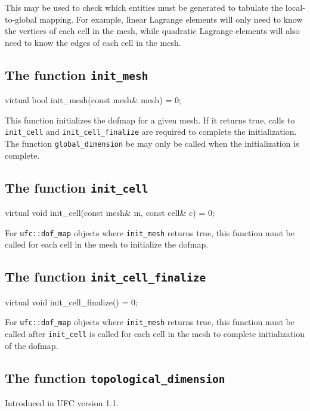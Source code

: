 This may be used to check which entities must be generated to tabulate
the local-to-global mapping. For example, linear Lagrange elements
will only need to know the vertices of each cell in the mesh, while
quadratic Lagrange elements will also need to know the edges of each
cell in the mesh.

\subsection{The function \texttt{init\_mesh}}

\begin{code}
virtual bool init_mesh(const mesh& mesh) = 0;
\end{code}

This function initializes the dofmap for a given mesh. If it returns
true, calls to \texttt{init\_cell} and \texttt{init\_cell\_finalize}
are required to complete the initialization. The function
\texttt{global\_dimension} be may only be called when the
initialization is complete.

\subsection{The function \texttt{init\_cell}}

\begin{code}
virtual void init_cell(const mesh& m,
                       const cell& c) = 0;
\end{code}

For \texttt{ufc::dof\_map} objects where \texttt{init\_mesh} returns true,
this function must be called for each cell in the mesh to initialize
the dofmap.

\subsection{The function \texttt{init\_cell\_finalize}}

\begin{code}
virtual void init_cell_finalize() = 0;
\end{code}

For \texttt{ufc::dof\_map} objects where \texttt{init\_mesh} returns
true, this function must be called after \texttt{init\_cell} is called
for each cell in the mesh to complete initialization of the dofmap.

\subsection{The function \texttt{topological\_dimension}}
Introduced in UFC version 1.1.

